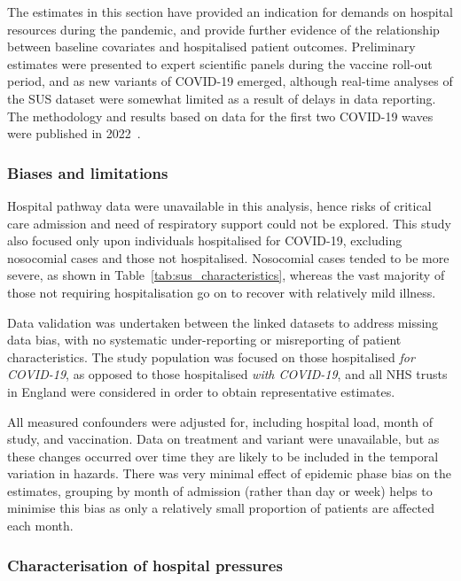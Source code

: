 The estimates in this section have provided an indication for demands on hospital resources during the pandemic, and provide further evidence of the relationship between baseline covariates and hospitalised patient outcomes. Preliminary estimates were presented to expert scientific panels during the vaccine roll-out period, and as new variants of COVID-19 emerged, although real-time analyses of the SUS dataset were somewhat limited as a result of delays in data reporting. The methodology and results based on data for the first two COVID-19 waves were published in 2022~\parencite{Kirwan2022-ka}.

\subsubsection{Biases and limitations}

Hospital pathway data were unavailable in this analysis, hence risks of critical care admission and need of respiratory support could not be explored. This study also focused only upon individuals hospitalised for COVID-19, excluding nosocomial cases and those not hospitalised. Nosocomial cases tended to be more severe, as shown in Table~\ref{tab:sus_characteristics}, whereas the vast majority of those not requiring hospitalisation go on to recover with relatively mild illness.

Data validation was undertaken between the linked datasets to address missing data bias, with no systematic under-reporting or misreporting of patient characteristics. The study population was focused on those hospitalised \textit{for COVID-19}, as opposed to those hospitalised \textit{with COVID-19}, and all NHS trusts in England were considered in order to obtain representative estimates.

All measured confounders were adjusted for, including hospital load, month of study, and vaccination. Data on treatment and variant were unavailable, but as these changes occurred over time they are likely to be included in the temporal variation in hazards. There was very minimal effect of epidemic phase bias on the estimates, grouping by month of admission (rather than day or week) helps to minimise this bias as only a relatively small proportion of patients are affected each month.

\subsubsection{Characterisation of hospital pressures}

